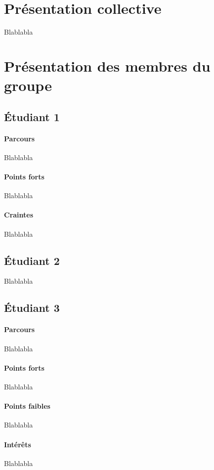 \section{Présentation collective}

	Blablabla

\section{Présentation des membres du groupe}

	\subsection{Étudiant 1}
		\paragraph*{Parcours}
			Blablabla
		\paragraph*{Points forts}
			Blablabla
		\paragraph*{Craintes}
			Blablabla
	
	\subsection{Étudiant 2}
		Blablabla
	
	\subsection{Étudiant 3}
		\paragraph*{Parcours}
			Blablabla
		\paragraph*{Points forts}
			Blablabla
		\paragraph*{Points faibles}
			Blablabla
		\paragraph*{Intérêts}
			Blablabla
	
